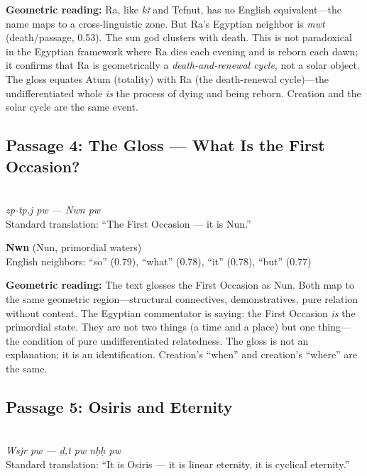 \documentclass[11pt, a4paper]{article}
\newcommand{\passagehiero}[1]{{\normalfont\hierofont\fontsize{14}{17}\selectfont #1}}
\begin{document}
\medskip

{\color{insight}\textbf{Geometric reading:}} Ra, like \textit{kꜣ} and Tefnut, has no English equivalent---the name maps to a cross-linguistic zone. But Ra's Egyptian neighbor is \textit{mwt} (death/passage, 0.53). The sun god clusters with death. This is not paradoxical in the Egyptian framework where Ra dies each evening and is reborn each dawn; it confirms that Ra is geometrically a \textit{death-and-renewal cycle}, not a solar object. The gloss equates Atum (totality) with Ra (the death-renewal cycle)---the undifferentiated whole \textit{is} the process of dying and being reborn. Creation and the solar cycle are the same event.

\subsection{Passage 4: The Gloss --- What Is the First Occasion?}

{\color{passage}\passagehiero{𓊃𓊪𓁶𓏤𓇋 𓊪𓅱 --- 𓈖𓅱𓈖𓈗 𓊪𓅱}\\\medskip
\textit{\small zp-tp,j pw --- Nwn pw}\\
Standard translation: ``The First Occasion --- it is Nun.''}

\bigskip

\noindent\textbf{Nwn} (Nun, primordial waters)\\
English neighbors: ``so'' (0.79), ``what'' (0.78), ``it'' (0.78), ``but'' (0.77)

\medskip

{\color{insight}\textbf{Geometric reading:}} The text glosses the First Occasion as Nun. Both map to the same geometric region---structural connectives, demonstratives, pure relation without content. The Egyptian commentator is saying: the First Occasion \textit{is} the primordial state. They are not two things (a time and a place) but one thing---the condition of pure undifferentiated relatedness. The gloss is not an explanation; it is an identification. Creation's ``when'' and creation's ``where'' are the same.

\subsection{Passage 5: Osiris and Eternity}

{\color{passage}\passagehiero{𓊨𓁹𓀭 𓊪𓅱 --- 𓆓𓏏 𓊪𓅱 𓎛𓇳𓎛 𓊪𓅱}\\\medskip
\textit{\small Wsjr pw --- ḏ,t pw nḥḥ pw}\\
Standard translation: ``It is Osiris --- it is linear eternity, it is cyclical eternity.''}
\end{document}
